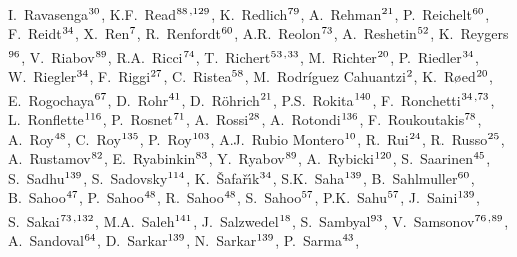 \begin{flushleft}
I.~Ravasenga$^\textrm{\scriptsize 30}$,
K.F.~Read$^\textrm{\scriptsize 88}$\textsuperscript{,}$^\textrm{\scriptsize 129}$,
K.~Redlich$^\textrm{\scriptsize 79}$,
A.~Rehman$^\textrm{\scriptsize 21}$,
P.~Reichelt$^\textrm{\scriptsize 60}$,
F.~Reidt$^\textrm{\scriptsize 34}$,
X.~Ren$^\textrm{\scriptsize 7}$,
R.~Renfordt$^\textrm{\scriptsize 60}$,
A.R.~Reolon$^\textrm{\scriptsize 73}$,
A.~Reshetin$^\textrm{\scriptsize 52}$,
K.~Reygers$^\textrm{\scriptsize 96}$,
V.~Riabov$^\textrm{\scriptsize 89}$,
R.A.~Ricci$^\textrm{\scriptsize 74}$,
T.~Richert$^\textrm{\scriptsize 53}$\textsuperscript{,}$^\textrm{\scriptsize 33}$,
M.~Richter$^\textrm{\scriptsize 20}$,
P.~Riedler$^\textrm{\scriptsize 34}$,
W.~Riegler$^\textrm{\scriptsize 34}$,
F.~Riggi$^\textrm{\scriptsize 27}$,
C.~Ristea$^\textrm{\scriptsize 58}$,
M.~Rodr\'{i}guez Cahuantzi$^\textrm{\scriptsize 2}$,
K.~R{\o}ed$^\textrm{\scriptsize 20}$,
E.~Rogochaya$^\textrm{\scriptsize 67}$,
D.~Rohr$^\textrm{\scriptsize 41}$,
D.~R\"ohrich$^\textrm{\scriptsize 21}$,
P.S.~Rokita$^\textrm{\scriptsize 140}$,
F.~Ronchetti$^\textrm{\scriptsize 34}$\textsuperscript{,}$^\textrm{\scriptsize 73}$,
L.~Ronflette$^\textrm{\scriptsize 116}$,
P.~Rosnet$^\textrm{\scriptsize 71}$,
A.~Rossi$^\textrm{\scriptsize 28}$,
A.~Rotondi$^\textrm{\scriptsize 136}$,
F.~Roukoutakis$^\textrm{\scriptsize 78}$,
A.~Roy$^\textrm{\scriptsize 48}$,
C.~Roy$^\textrm{\scriptsize 135}$,
P.~Roy$^\textrm{\scriptsize 103}$,
A.J.~Rubio Montero$^\textrm{\scriptsize 10}$,
R.~Rui$^\textrm{\scriptsize 24}$,
R.~Russo$^\textrm{\scriptsize 25}$,
A.~Rustamov$^\textrm{\scriptsize 82}$,
E.~Ryabinkin$^\textrm{\scriptsize 83}$,
Y.~Ryabov$^\textrm{\scriptsize 89}$,
A.~Rybicki$^\textrm{\scriptsize 120}$,
S.~Saarinen$^\textrm{\scriptsize 45}$,
S.~Sadhu$^\textrm{\scriptsize 139}$,
S.~Sadovsky$^\textrm{\scriptsize 114}$,
K.~\v{S}afa\v{r}\'{\i}k$^\textrm{\scriptsize 34}$,
S.K.~Saha$^\textrm{\scriptsize 139}$,
B.~Sahlmuller$^\textrm{\scriptsize 60}$,
B.~Sahoo$^\textrm{\scriptsize 47}$,
P.~Sahoo$^\textrm{\scriptsize 48}$,
R.~Sahoo$^\textrm{\scriptsize 48}$,
S.~Sahoo$^\textrm{\scriptsize 57}$,
P.K.~Sahu$^\textrm{\scriptsize 57}$,
J.~Saini$^\textrm{\scriptsize 139}$,
S.~Sakai$^\textrm{\scriptsize 73}$\textsuperscript{,}$^\textrm{\scriptsize 132}$,
M.A.~Saleh$^\textrm{\scriptsize 141}$,
J.~Salzwedel$^\textrm{\scriptsize 18}$,
S.~Sambyal$^\textrm{\scriptsize 93}$,
V.~Samsonov$^\textrm{\scriptsize 76}$\textsuperscript{,}$^\textrm{\scriptsize 89}$,
A.~Sandoval$^\textrm{\scriptsize 64}$,
D.~Sarkar$^\textrm{\scriptsize 139}$,
N.~Sarkar$^\textrm{\scriptsize 139}$,
P.~Sarma$^\textrm{\scriptsize 43}$,

\end{flushleft}

